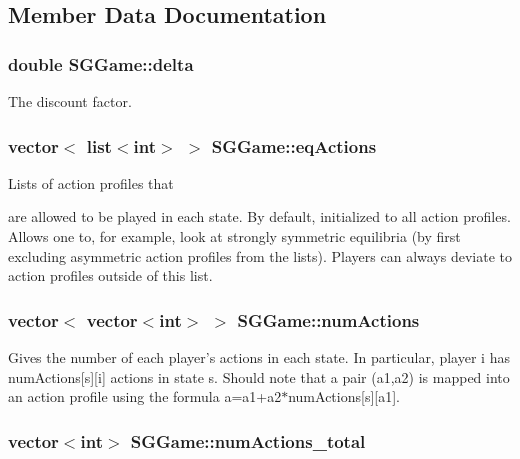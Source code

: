 \subsection{Member Data Documentation}
\hypertarget{classSGGame_a5031fc31f8009c19901c0930224e0465}{
\subsubsection[{delta}]{\setlength{\rightskip}{0pt plus 5cm}double S\-G\-Game\-::delta\hspace{0.3cm}{\ttfamily [private]}}}\label{classSGGame_a5031fc31f8009c19901c0930224e0465}
The discount factor. \hypertarget{classSGGame_a900ba2e4035c19b19dd5342219862347}{
\subsubsection[{eq\-Actions}]{\setlength{\rightskip}{0pt plus 5cm}vector$<$ list$<$int$>$ $>$ S\-G\-Game\-::eq\-Actions\hspace{0.3cm}{\ttfamily [private]}}}\label{classSGGame_a900ba2e4035c19b19dd5342219862347}
\begin{DoxyVerb}  Lists of action profiles that
\end{DoxyVerb}
 are allowed to be played in each state. By default, initialized to all action profiles. Allows one to, for example, look at strongly symmetric equilibria (by first excluding asymmetric action profiles from the lists). Players can always deviate to action profiles outside of this list. \hypertarget{classSGGame_acebe94d195ffb67f92925bcd4c26d1a9}{
\subsubsection[{num\-Actions}]{\setlength{\rightskip}{0pt plus 5cm}vector$<$ vector$<$int$>$ $>$ S\-G\-Game\-::num\-Actions\hspace{0.3cm}{\ttfamily [private]}}}\label{classSGGame_acebe94d195ffb67f92925bcd4c26d1a9}
Gives the number of each player's actions in each state. In particular, player i has num\-Actions\mbox{[}s\mbox{]}\mbox{[}i\mbox{]} actions in state s. Should note that a pair (a1,a2) is mapped into an action profile using the formula a=a1+a2$\ast$num\-Actions\mbox{[}s\mbox{]}\mbox{[}a1\mbox{]}. \hypertarget{classSGGame_a3b219a37177b5b8b38737f570e419429}{
\subsubsection[{num\-Actions\-\_\-total}]{\setlength{\rightskip}{0pt plus 5cm}vector$<$int$>$ S\-G\-Game\-::num\-Actions\-\_\-total\hspace{0.3cm}{\ttfamily [private]}}}\label{classSGGame_a3b219a37177b5b8b38737f570e419429}
